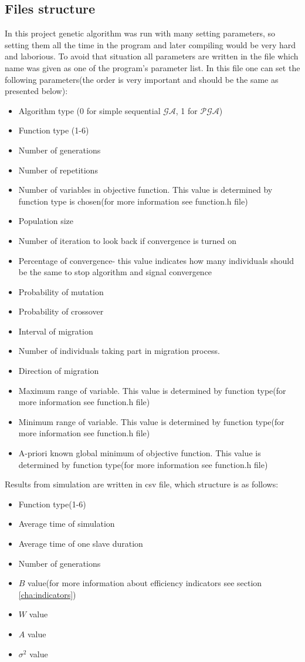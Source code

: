 \subsection{Files structure}
In this project genetic algorithm was run with many setting parameters, so
setting them all the time in the program and later compiling would be very hard
and laborious. To avoid that situation all parameters are written in the file which name was given as one of the program's parameter
list. In this file one can set the following parameters(the order is very
important and should be the same as presented below):
\begin{itemize}
	\item Algorithm type (0 for simple sequential $\mathcal{GA}$,
		1 for $\mathcal{PGA}$)
	\item Function type (1-6)
	\item Number of generations 
	\item Number of repetitions
	\item Number of variables in objective function. This value is determined by
		function type is chosen(for more information see function.h file)
	\item Population size
	\item Number of iteration to look back if convergence is turned on
	\item Percentage of convergence- this value indicates how many individuals should be
		the same to stop algorithm and signal convergence
	\item Probability of mutation
	\item Probability of crossover
	\item Interval of migration
	\item Number of individuals taking part in migration process. 
	\item Direction of migration
	\item Maximum range of variable. This value is determined by
		function type(for more information see function.h file)
	\item Minimum range of variable. This value is determined by
		function type(for more information see function.h file)
	\item A-priori known global minimum of objective function. This value is determined by
		function type(for more information see function.h file)
\end{itemize}
Results from simulation are written in csv file, which structure is as follows:
\begin{itemize}
	\item Function type(1-6)
	\item Average time of simulation
	\item Average time of one slave duration
	\item Number of generations
	\item $B$ value(for more information about efficiency indicators see section
		\ref{cha:indicators})
	\item $W$ value
	\item $A$ value
	\item $\sigma^2$ value
\end{itemize}
